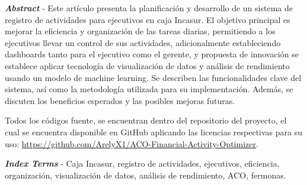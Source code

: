 \textbf{\textit{Abstract}} - Este artículo presenta la planificación y desarrollo de un sistema de registro de actividades para ejecutivos en caja Incasur. El objetivo principal es mejorar la eficiencia y organización de las tareas diarias, permitiendo a los ejecutivos llevar un control de sus actividades, adicionalmente estableciendo dashboards tanto para el ejecutivo como el gerente, y propuesta de innovación se establece aplicar tecnología de visualización de datos y análisis de rendimiento usando un modelo de machine learning. Se describen las funcionalidades clave del sistema, así como la metodología utilizada para su implementación. Además, se discuten los beneficios esperados y las posibles mejoras futuras.

Todos los códigos fuente, se encuentran dentro del repositorio del proyecto, el cual se encuentra disponible en GitHub aplicando las licencias respectivas para su uso: \url{https://github.com/ArelyX1/ACO-Financial-Activity-Optimizer}.
\vspace{0.5em}

\textbf{\textit{Index Terms}} - Caja Incasur, registro de actividades, ejecutivos, eficiencia, organización, visualización de datos, análisis de rendimiento, ACO, fermonas.